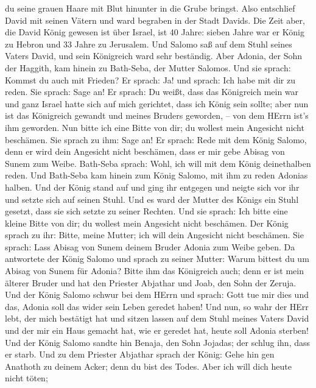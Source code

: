 du seine grauen Haare mit Blut hinunter in die Grube bringst.
 Also entschlief David mit seinen Vätern und ward begraben
in der Stadt Davids.  Die Zeit aber, die David König
gewesen ist über Israel, ist 40 Jahre: sieben Jahre war er König zu
Hebron und 33 Jahre zu Jerusalem.  Und Salomo saß auf dem
Stuhl seines Vaters David, und sein Königreich ward sehr beständig.
 Aber Adonia, der Sohn der Haggith, kam hinein zu
Bath-Seba, der Mutter Salomos. Und sie sprach: Kommst du auch mit
Frieden? Er sprach: Ja!  und sprach: Ich habe mit dir zu
reden. Sie sprach: Sage an!  Er sprach: Du weißt, dass das
Königreich mein war und ganz Israel hatte sich auf mich gerichtet, dass
ich König sein sollte; aber nun ist das Königreich gewandt und meines
Bruders geworden, -- von dem HErrn ist's ihm geworden.  Nun
bitte ich eine Bitte von dir; du wollest mein Angesicht nicht beschämen.
Sie sprach zu ihm: Sage an!  Er sprach: Rede mit dem König
Salomo, denn er wird dein Angesicht nicht beschämen, dass er mir gebe
Abisag von Sunem zum Weibe.  Bath-Seba sprach: Wohl, ich
will mit dem König deinethalben reden.  Und Bath-Seba kam
hinein zum König Salomo, mit ihm zu reden Adonias halben. Und der König
stand auf und ging ihr entgegen und neigte sich vor ihr und setzte sich
auf seinen Stuhl. Und es ward der Mutter des Königs ein Stuhl gesetzt,
dass sie sich setzte zu seiner Rechten.  Und sie sprach:
Ich bitte eine kleine Bitte von dir; du wollest mein Angesicht nicht
beschämen. Der König sprach zu ihr: Bitte, meine Mutter; ich will dein
Angesicht nicht beschämen.  Sie sprach: Lass Abisag von
Sunem deinem Bruder Adonia zum Weibe geben.  Da antwortete
der König Salomo und sprach zu seiner Mutter: Warum bittest du um Abisag
von Sunem für Adonia? Bitte ihm das Königreich auch; denn er ist mein
älterer Bruder und hat den Priester Abjathar und Joab, den Sohn der
Zeruja.  Und der König Salomo schwur bei dem HErrn und
sprach: Gott tue mir dies und das, Adonia soll das wider sein Leben
geredet haben!  Und nun, so wahr der HErr lebt, der mich
bestätigt hat und sitzen lassen auf dem Stuhl meines Vaters David und
der mir ein Haus gemacht hat, wie er geredet hat, heute soll Adonia
sterben!  Und der König Salomo sandte hin Benaja, den Sohn
Jojadas; der schlug ihn, dass er starb.  Und zu dem
Priester Abjathar sprach der König: Gehe hin gen Anathoth zu deinem
Acker; denn du bist des Todes. Aber ich will dich heute nicht töten;
